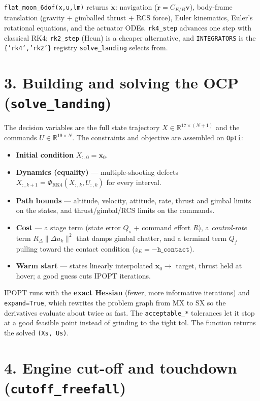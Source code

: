 \documentclass[11pt]{article}
\newcommand{\code}[1]{\texttt{#1}}
\begin{document}
\code{flat\_moon\_6dof(x,u,lm)} returns $\dot{\bm x}$: navigation
($\dot{\bm r}=C_{E/B}\bm v$), body-frame translation (gravity + gimballed thrust
+ RCS force), Euler kinematics, Euler's rotational equations, and the actuator
ODEs. \code{rk4\_step} advances one step with classical RK4; \code{rk2\_step}
(Heun) is a cheaper alternative, and \code{INTEGRATORS} is the \code{\{'rk4','rk2'\}}
registry \code{solve\_landing} selects from.

\section*{3. Building and solving the OCP (\code{solve\_landing})}

The decision variables are the full state trajectory
$X\in\mathbb R^{17\times(N+1)}$ and the commands $U\in\mathbb R^{19\times N}$.
The constraints and objective are assembled on \code{Opti}:
\begin{itemize}\itemsep2pt
  \item \textbf{Initial condition} $X_{:,0}=\bm x_0$.
  \item \textbf{Dynamics (equality)} --- multiple-shooting defects
        $X_{:,k+1}=\Phi_{\mathrm{RK4}}(X_{:,k},U_{:,k})$ for every interval.
  \item \textbf{Path bounds} --- altitude, velocity, attitude, rate, thrust and
        gimbal limits on the states, and thrust/gimbal/RCS limits on the commands.
  \item \textbf{Cost} --- a stage term (state error $Q_s$ + command effort $R$),
        a \emph{control-rate} term $R_\Delta\lVert\Delta u_k\rVert^2$ that damps
        gimbal chatter, and a terminal term $Q_f$ pulling toward the contact
        condition ($z_E=-\code{h\_contact}$).
  \item \textbf{Warm start} --- states linearly interpolated $\bm x_0\!\to\!$
        target, thrust held at hover; a good guess cuts IPOPT iterations.
\end{itemize}
IPOPT runs with the \textbf{exact Hessian} (fewer, more informative iterations)
and \code{expand=True}, which rewrites the problem graph from MX to SX so the
derivatives evaluate about twice as fast. The \code{acceptable\_*} tolerances let
it stop at a good feasible point instead of grinding to the tight tol. The
function returns the solved \code{(Xs, Us)}.

\section*{4. Engine cut-off and touchdown (\code{cutoff\_freefall})}
\end{document}
